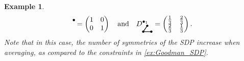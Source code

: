 \documentclass[a4paper,11pt]{article}
\newtheorem{example}[theorem]{Example}
\numberwithin{equation}{section}
\begin{document}
\begin{example}
\begin{align*}
{\begin{tikzpicture}[line width=0.3mm, baseline=0ex,
        scale = 0.4]
            \fill [black] (0.5,0.75) circle (4pt);
        \end{tikzpicture}}
        =
        \begin{pmatrix}
            1 & 0 \\ 0 & 1
        \end{pmatrix} \quad \text{and} \quad
        D^{\bullet_1}_{\begin{tikzpicture}[line width=0.3mm, baseline=0ex,
        scale = 0.4]
            \draw [black] (0,0) -- (1,0);
            \draw [black] (0,0) -- (0.5,0.75);
            \fill [black] (0,0) circle (4pt);
            \fill [black] (1,0) circle (4pt);
            \fill [black] (0.5,0.75) circle (4pt);
        \end{tikzpicture}}
        =
        \begin{pmatrix}
            \frac{1}{3} & \frac{2}{3} \\ \frac{2}{3} & \frac{1}{3}
        \end{pmatrix}.
    \end{align*}
    Note that in this case, the number of symmetries of the SDP increase when averaging, as compared to the constraints in \cref{ex:Goodman_SDP}.
\end{example}
\end{document}
